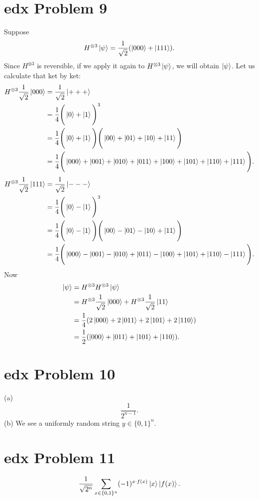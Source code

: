 \documentclass[10pt]{article}
\begin{document}
\section*{edx Problem 9}
Suppose
\[
H^{\otimes 3} \ket{\psi} = \frac{1}{\sqrt{2}} (\ket{000} + \ket{111}).
\]
Since $H^{\otimes 3}$ is reversible, if we apply it again to $H^{\otimes 3} \ket{\psi}$, we will obtain $\ket{\psi}$. Let us calculate that ket by ket:
\begin{align*}
H^{\otimes 3}\frac{1}{\sqrt{2}} \ket{000} &= \frac{1}{\sqrt{2}} \ket{+++} \\
		&= \frac{1}{4} \Bigg( \ket{0} + \ket{1} \Bigg)^3 \\
		&= \frac{1}{4} \Bigg( \ket{0} + \ket{1} \Bigg) \Bigg( \ket{00} + \ket{01} + \ket{10} + \ket{11} \Bigg) \\
		&= \frac{1}{4} \Bigg( \ket{000} + \ket{001} + \ket{010} + \ket{011} + \ket{100} + \ket{101} + \ket{110} + \ket{111} \Bigg).
\end{align*}
\begin{align*}
H^{\otimes 3}\frac{1}{\sqrt{2}} \ket{111} &= \frac{1}{\sqrt{2}} \ket{---} \\
		&= \frac{1}{4} \Bigg( \ket{0} - \ket{1} \Bigg)^3 \\
		&= \frac{1}{4} \Bigg( \ket{0} - \ket{1} \Bigg) \Bigg( \ket{00} - \ket{01} - \ket{10} + \ket{11} \Bigg) \\
		&= \frac{1}{4} \Bigg( \ket{000} - \ket{001} - \ket{010} + \ket{011} - \ket{100} + \ket{101} + \ket{110} - \ket{111} \Bigg).
\end{align*}
Now
\begin{align*}
\ket{\psi} &= H^{\otimes 3} H^{\otimes 3}  \ket{\psi} \\
                &= H^{\otimes 3} \frac{1}{\sqrt{2}} \ket{000} + H^{\otimes 3} \frac{1}{\sqrt{2}} \ket{11} \\
                &= \frac{1}{4} (2\ket{000} + 2\ket{011} + 2\ket{101} + 2\ket{110}) \\
                &= \frac{1}{2} (\ket{000} + \ket{011} + \ket{101} + \ket{110}).
\end{align*}

\section*{edx Problem 10}
(a)
\[
\frac{1}{2^{n - 1}}.
\]
(b) We see a uniformly random string $y \in \{ 0, 1 \}^n$.

\section*{edx Problem 11}
\[
\frac{1}{\sqrt{2^n}} \sum_{x \in \{ 0, 1 \}^n} (-1)^{x \cdot f(x)} \ket{x} \ket{f(x)}.
\]
\end{document}
